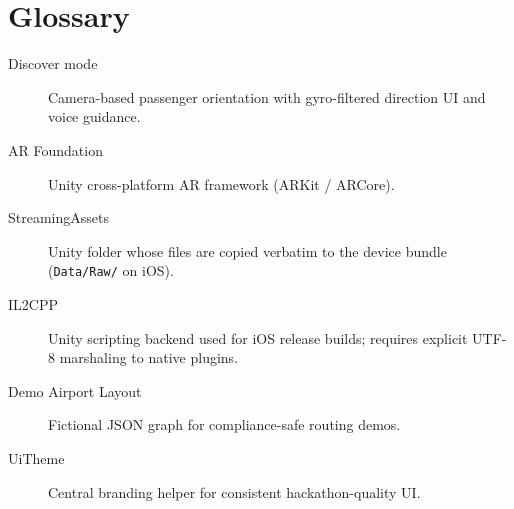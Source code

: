 \documentclass[11pt,a4paper]{article}
\begin{document}
\section{Glossary}

\begin{description}
    \item[Discover mode] Camera-based passenger orientation with gyro-filtered direction UI and voice guidance.
    \item[AR Foundation] Unity cross-platform AR framework (ARKit / ARCore).
    \item[StreamingAssets] Unity folder whose files are copied verbatim to the device bundle (\texttt{Data/Raw/} on iOS).
    \item[IL2CPP] Unity scripting backend used for iOS release builds; requires explicit UTF-8 marshaling to native plugins.
    \item[Demo Airport Layout] Fictional JSON graph for compliance-safe routing demos.
    \item[UiTheme] Central branding helper for consistent hackathon-quality UI.
\end{description}
\end{document}
